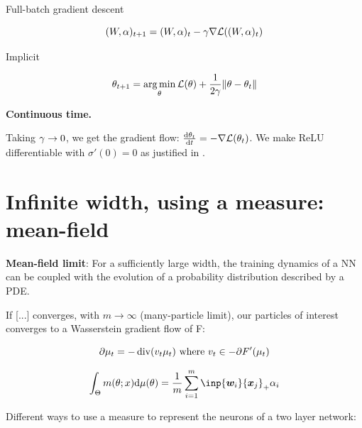 Full-batch gradient descent

\begin{equation}
	(W, \alpha)_{t+1} = (W, \alpha)_t - \gamma \nabla \mathcal{L}((W, \alpha)_t)
\end{equation}

Implicit

\begin{equation}
	\theta_{t+1} = \operatorname*{arg\,min}_{\theta} \mathcal{L}(\theta) +\frac{1}{2\gamma} \lVert\theta - \theta_t\rVert
\end{equation}

\textbf{Continuous time.}

Taking $\gamma \to 0$, we get the gradient flow: $\frac{\mathrm{d} \theta_t}{\mathrm{d} t} = - \nabla \mathcal{L}(\theta_t)$. We make ReLU differentiable with $\sigma'(0)=0$ as justified in \citep{boursierGradientFlowDynamics2022}.

\section{Infinite width, using a measure: mean-field}

\textbf{Mean-field limit}\citep{chizatGlobalConvergenceGradient2018}: For a sufficiently large width, the training dynamics of a NN can be coupled with the evolution of a probability distribution described by a PDE.

If [...] converges, with $m \rightarrow \infty$ (many-particle limit), our particles of interest converges to a Wasserstein gradient flow of F:

\begin{equation}
	\partial \mu_t = - \operatorname*{div}(v_t \mu_t) \text{ where } v_t \in - \partial F'(\mu_t)
\end{equation}

\begin{equation}
	\int_\paramS m(\param; x) \dd \mu(\param) = \frac{1}{m} \sum_{i=1}^{m} \inp{\vw_i}{\vx_j}_+ \alpha_i
\end{equation}

Different ways to use a measure to represent the neurons of a two layer network:

